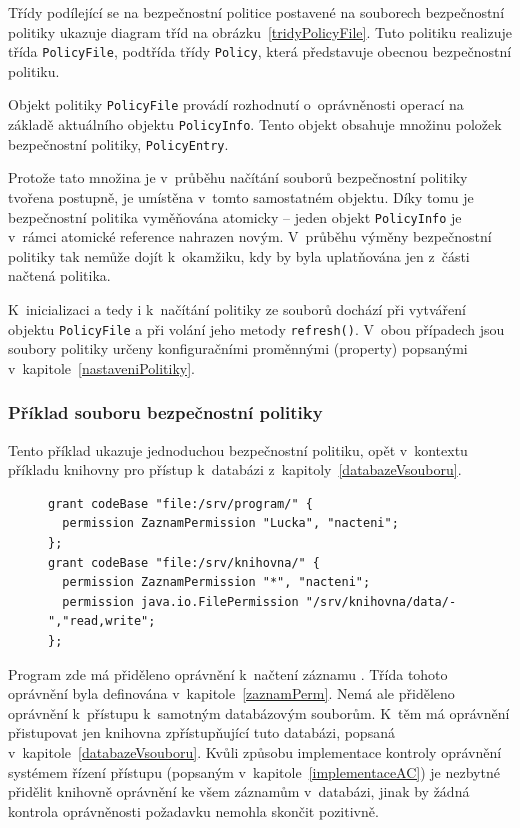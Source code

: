 Třídy podílející se na bezpečnostní politice postavené na souborech bezpečnostní politiky ukazuje diagram tříd na obrázku~\ref{tridyPolicyFile}.
Tuto politiku realizuje třída {\tt PolicyFile}, podtřída třídy {\tt Policy}, která představuje obecnou bezpečnostní politiku.

Objekt politiky {\tt PolicyFile} provádí rozhodnutí o~oprávněnosti operací na základě aktuálního objektu {\tt PolicyInfo}.
Tento objekt obsahuje množinu položek bezpečnostní politiky, {\tt PolicyEntry}.

Protože tato množina je v~průběhu načítání souborů bezpečnostní politiky tvořena postupně, je umístěna v~tomto samostatném objektu.
Díky tomu je bezpečnostní politika vyměňována atomicky -- jeden objekt {\tt PolicyInfo} je v~rámci atomické reference nahrazen novým.
V~průběhu výměny bezpečnostní politiky tak nemůže dojít k~okamžiku, kdy by byla uplatňována jen z~části načtená politika.

K~inicializaci a tedy i k~načítání politiky ze souborů dochází při vytváření objektu {\tt PolicyFile} a při volání jeho metody {\tt refresh()}.
V~obou případech jsou soubory politiky určeny konfiguračními proměnnými (property) popsanými v~kapitole~\ref{nastaveniPolitiky}.

\subsubsection{Příklad souboru bezpečnostní politiky}

Tento příklad ukazuje jednoduchou bezpečnostní politiku, opět v~kontextu příkladu knihovny pro přístup k~databázi z~kapitoly~\ref{databazeVsouboru}.

\begin{figure}[b!]
\begin{lstlisting}[caption=Příklad souboru bezpečnostní politiky, label=prikladSouboruBP]
grant codeBase "file:/srv/program/" {
  permission ZaznamPermission "Lucka", "nacteni";
};
grant codeBase "file:/srv/knihovna/" {
  permission ZaznamPermission "*", "nacteni";
  permission java.io.FilePermission "/srv/knihovna/data/-","read,write";
};
\end{lstlisting}
\end{figure}

Program zde má přiděleno oprávnění k~načtení záznamu . Třída tohoto oprávnění byla definována v~kapitole~\ref{zaznamPerm}.
Nemá ale přiděleno oprávnění k~přístupu k~samotným databázovým souborům.
K~těm má oprávnění přistupovat jen knihovna zpřístupňující tuto databázi, popsaná v~kapitole~\ref{databazeVsouboru}.
Kvůli způsobu implementace kontroly oprávnění systémem řízení přístupu (popsaným v~kapitole~\ref{implementaceAC}) je nezbytné přidělit knihovně oprávnění ke všem záznamům v~databázi, jinak by žádná kontrola oprávněnosti požadavku nemohla skončit pozitivně.

